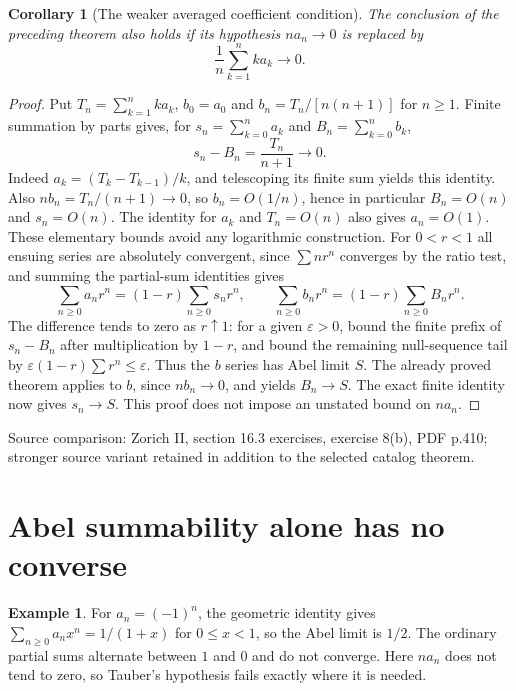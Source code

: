 \documentclass[11pt,oneside,a4paper]{book}
\newtheorem{corollary}[theorem]{Corollary}
\theoremstyle{definition}
\newtheorem{example}[theorem]{Example}
\theoremstyle{remark}
\newcommand{\eps}{\varepsilon}
\newcommand{\KEntry}[2]{\Needspace{7\baselineskip}\section{#2}\label{#1}{\small\sffamily\color{black!60}\detokenize{#1}}\par}
\newcommand{\SourceRef}[1]{{\small\textsf{Source comparison: #1.}}}
\begin{document}
\begin{corollary}[The weaker averaged coefficient condition]
The conclusion of the preceding theorem also holds if its hypothesis $na_n\to0$ is replaced by
\[
 \frac1n\sum_{k=1}^n k a_k\longrightarrow0.
\]
\end{corollary}
\begin{proof}
Put $T_n=\sum_{k=1}^nka_k$, $b_0=a_0$ and $b_n=T_n/[n(n+1)]$ for $n\geq1$. Finite summation by parts gives, for $s_n=\sum_{k=0}^na_k$ and $B_n=\sum_{k=0}^nb_k$,
\[
 s_n-B_n=\frac{T_n}{n+1}\longrightarrow0.
\]
Indeed $a_k=(T_k-T_{k-1})/k$, and telescoping its finite sum yields this identity. Also $nb_n=T_n/(n+1)\to0$, so $b_n=O(1/n)$, hence in particular $B_n=O(n)$ and $s_n=O(n)$. The identity for $a_k$ and $T_n=O(n)$ also gives $a_n=O(1)$. These elementary bounds avoid any logarithmic construction. For $0<r<1$ all ensuing series are absolutely convergent, since $\sum nr^n$ converges by the ratio test, and summing the partial-sum identities gives
\[
 \sum_{n\geq0}a_nr^n=(1-r)\sum_{n\geq0}s_nr^n,
 \qquad \sum_{n\geq0}b_nr^n=(1-r)\sum_{n\geq0}B_nr^n.
\]
The difference tends to zero as $r\uparrow1$: for a given $\eps>0$, bound the finite prefix of $s_n-B_n$ after multiplication by $1-r$, and bound the remaining null-sequence tail by $\eps(1-r)\sum r^n\leq\eps$. Thus the $b$ series has Abel limit $S$. The already proved theorem applies to $b$, since $nb_n\to0$, and yields $B_n\to S$. The exact finite identity now gives $s_n\to S$. This proof does not impose an unstated bound on $na_n$.
\end{proof}
\SourceRef{Zorich II, section 16.3 exercises, exercise 8(b), PDF p.410; stronger source variant retained in addition to the selected catalog theorem}

\KEntry{K03.13.abel_not_converse}{Abel summability alone has no converse}
\begin{example}
For $a_n=(-1)^n$, the geometric identity gives $\sum_{n\geq0}a_nx^n=1/(1+x)$ for $0\leq x<1$, so the Abel limit is $1/2$. The ordinary partial sums alternate between $1$ and $0$ and do not converge. Here $na_n$ does not tend to zero, so Tauber's hypothesis fails exactly where it is needed.
\end{example}
\end{document}
